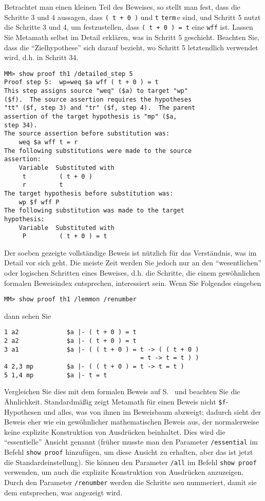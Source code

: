 Betrachtet man einen kleinen Teil des Beweises, so stellt man fest, dass die Schritte 3 und 4 aussagen, dass \texttt{( t + 0 )} und \texttt{t} \texttt{term}\,e sind, und Schritt 5 nutzt die Schritte 3 und 4, um festzustellen, dass \texttt{( t + 0 ) = t} eine \texttt{wff} ist.  Lassen Sie Metamath selbst im Detail erklären, was in Schritt 5 geschieht.  Beachten Sie, dass die "`Zielhypothese"' sich darauf bezieht, wo Schritt 5 letztendlich verwendet wird, d.h. in Schritt 34.
\begin{verbatim}
MM> show proof th1 /detailed_step 5
Proof step 5:  wp=weq $a wff ( t + 0 ) = t
This step assigns source "weq" ($a) to target "wp"
($f).  The source assertion requires the hypotheses
"tt" ($f, step 3) and "tr" ($f, step 4).  The parent
assertion of the target hypothesis is "mp" ($a,
step 34).
The source assertion before substitution was:
    weq $a wff t = r
The following substitutions were made to the source
assertion:
    Variable  Substituted with
     t         ( t + 0 )
     r         t
The target hypothesis before substitution was:
    wp $f wff P
The following substitution was made to the target
hypothesis:
    Variable  Substituted with
     P         ( t + 0 ) = t
\end{verbatim}

Der soeben gezeigte vollständige Beweis ist nützlich für das Verständnis, was im Detail vor sich geht.
Die meiste Zeit werden Sie jedoch nur an den "`wesentlichen"' oder logischen Schritten eines Beweises, d.h. die Schritte, die einem gewöhnlichen formalen Beweisindex entsprechen, interessiert sein.  Wenn Sie Folgendes eingeben
\begin{verbatim}
MM> show proof th1 /lemmon /renumber
\end{verbatim}
dann sehen Sie\label{demoproof}
\begin{verbatim}
1 a2             $a |- ( t + 0 ) = t
2 a2             $a |- ( t + 0 ) = t
3 a1             $a |- ( ( t + 0 ) = t -> ( ( t + 0 )
                                     = t -> t = t ) )
4 2,3 mp         $a |- ( ( t + 0 ) = t -> t = t )
5 1,4 mp         $a |- t = t
\end{verbatim}
Vergleichen Sie dies mit dem formalen Beweis auf S.~\pageref{zeroproof} und beachten Sie die Ähnlichkeit.
Standardmäßig zeigt Metamath für einen Beweis nicht \texttt{\$f}-Hypothesen und alles, was von ihnen im Beweisbaum abzweigt; dadurch sieht der Beweis eher wie ein gewöhnlicher mathematischen Beweis aus, der normalerweise keine explizite Konstruktion von Ausdrücken beinhaltet.
Dies wird die "`essentielle"' Ansicht genannt (früher musste man den Parameter \texttt{/essential} im Befehl \texttt{show proof} hinzufügen, um diese Ansicht zu erhalten, aber das ist jetzt die Standardeinstellung).
Sie können den Parameter \texttt{/all} im Befehl \texttt{show proof} verwenden, um auch die explizite Konstruktion von Ausdrücken anzuzeigen.
Durch den Parameter \texttt{/renumber} werden die Schritte neu nummeriert, damit sie dem entsprechen, was angezeigt wird.

